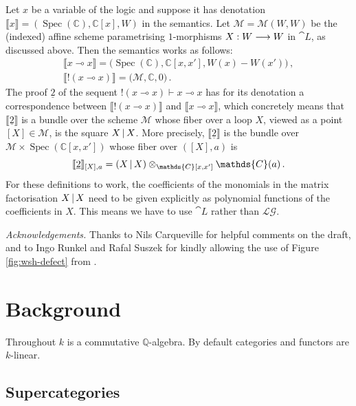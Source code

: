 \documentclass[english,letter paper,12pt,leqno]{article}
\theoremstyle{example}
\numberwithin{equation}{section}
\def\LG{\mathcal{LG}}
\def\be{\begin{equation}}
\def\ee{\end{equation}}
\def\nC{\mathds{C}}
\DeclareMathOperator{\Spec}{Spec}
\begin{document}
Let $x$ be a variable of the logic and suppose it has denotation $\llbracket x \rrbracket = (\Spec(\nC), \nC[x], W)$ in the semantics. Let $\mathscr{M} = \mathscr{M}(W,W)$ be the (indexed) affine scheme parametrising $1$-morphisms $X: W \longrightarrow W$ in $\cat{L}$, as discussed above. Then the semantics works as follows:
\begin{gather*}
\llbracket x \multimap x \rrbracket = \big(\Spec(\nC), \nC[x,x'], W(x) - W(x') \big)\,,\\
\llbracket {!}( x \multimap x ) \rrbracket = \big( \mathscr{M}, \nC, 0 \big)\,.
\end{gather*}
The proof $\underline{2}$ of the sequent ${!}(x \multimap x) \vdash x \multimap x$ has for its denotation a correspondence between $\llbracket {!}( x \multimap x ) \rrbracket$ and $\llbracket x \multimap x \rrbracket$, which concretely means that $\llbracket \underline{2} \rrbracket$ is a bundle over the scheme $\mathscr{M}$ whose fiber over a loop $X$, viewed as a point $[X] \in \mathscr{M}$, is the square $X \,|\, X$. More precisely, $\llbracket \underline{2} \rrbracket$ is the bundle over $\mathscr{M} \times \Spec(\nC[x,x'])$ whose fiber over $([X], a)$ is
\be\label{eq:bundledifferentialcliffordproof}
\llbracket \underline{2} \rrbracket_{[X],a} = \left( X \l X \right) \otimes_{\nC[x,x']} \nC(a)\,.
\ee
For these definitions to work, the coefficients of the monomials in the matrix factorisation $X \,|\, X$ need to be given explicitly as polynomial functions of the coefficients in $X$. This means we have to use $\cat{L}$ rather than $\LG$.

\medskip

\emph{Acknowledgements.} Thanks to Nils Carqueville for helpful comments on the draft, and to Ingo Runkel and Rafal Suszek for kindly allowing the use of Figure \ref{fig:wsh-defect} from \cite{runkel}. %

\section{Background}\label{section:background}

Throughout $k$ is a commutative $\mathbb{Q}$-algebra. By default categories and functors are $k$-linear.

\subsection{Supercategories}
\end{document}
